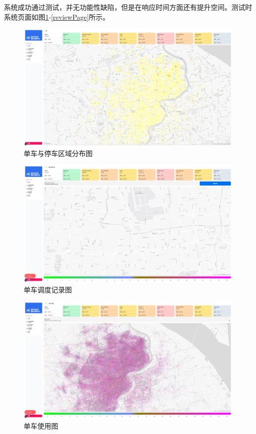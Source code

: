 系统成功通过测试，并无功能性缺陷，但是在响应时间方面还有提升空间。测试时系统页面如图\ref{dashboard}-\ref{reviewPage}所示。

\begin{figure}[!htbp]
    \centering
    \includegraphics[width=\textwidth]{figures/dashboard.png}
    \caption{单车与停车区域分布图}\label{dashboard}
\end{figure}

\begin{figure}[!htbp]
    \centering
    \includegraphics[width=\textwidth]{figures/schedule.png}
    \caption{单车调度记录图}\label{schedule}
\end{figure}

\begin{figure}[!htbp]
    \centering
    \includegraphics[width=\textwidth]{figures/usage.png}
    \caption{单车使用图}\label{usagePage}
\end{figure}

